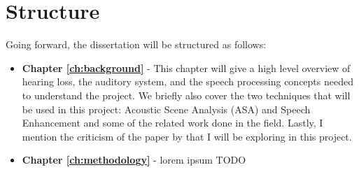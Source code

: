 \documentclass[logo,bsc,singlespacing,parskip,online]{infthesis}
\begin{document}
\section{Structure}
Going forward, the dissertation will be structured as follows:
\begin{itemize}  
   \item \textbf{Chapter \ref{ch:background}} - This chapter will give a high level overview of hearing loss, the auditory system, and the speech processing concepts needed to understand the project.
   We briefly also cover the two techniques that will be used in this project: Acoustic Scene Analysis (ASA) and Speech Enhancement
   and some of the related work done in the field. Lastly, I mention the criticism of the paper by \citet{Huwel2020HearDS} 
   that I will be exploring in this project.
   \item \textbf{Chapter \ref{ch:methodology}} - lorem ipsum
   TODO
\end{itemize}
 
\end{document}
